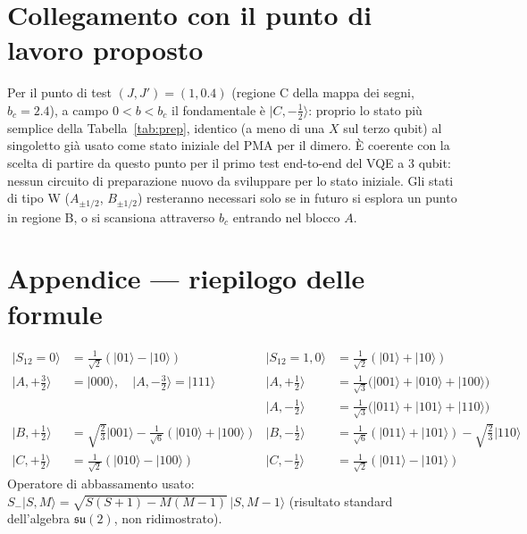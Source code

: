 \documentclass[11pt,a4paper]{article}
\newcommand{\ket}[1]{\lvert #1\rangle}
\begin{document}
\section{Collegamento con il punto di lavoro proposto}

Per il punto di test $(J,J')=(1,0.4)$ (regione C della mappa dei segni,
$b_c=2.4$), a campo $0<b<b_c$ il fondamentale è $\ket{C,{-}\tfrac12}$: proprio
lo stato più semplice della Tabella~\ref{tab:prep}, identico (a meno di una
$X$ sul terzo qubit) al singoletto già usato come stato iniziale del PMA per
il dimero. È coerente con la scelta di partire da questo punto per il primo
test end-to-end del VQE a 3 qubit: nessun circuito di preparazione nuovo da
sviluppare per lo stato iniziale. Gli stati di tipo W ($A_{\pm1/2}$, $B_{\pm1/2}$)
resteranno necessari solo se in futuro si esplora un punto in regione B, o si
scansiona attraverso $b_c$ entrando nel blocco $A$.

\section*{Appendice — riepilogo delle formule}
\begin{align*}
\ket{S_{12}{=}0} &= \tfrac1{\sqrt2}(\ket{01}-\ket{10}) &
\ket{S_{12}{=}1,0} &= \tfrac1{\sqrt2}(\ket{01}+\ket{10})\\
\ket{A,{+}\tfrac32} &= \ket{000},\quad \ket{A,{-}\tfrac32}=\ket{111} &
\ket{A,{+}\tfrac12} &= \tfrac1{\sqrt3}\big(\ket{001}{+}\ket{010}{+}\ket{100}\big) \\
& &
\ket{A,{-}\tfrac12} &= \tfrac1{\sqrt3}\big(\ket{011}{+}\ket{101}{+}\ket{110}\big) \\
\ket{B,{+}\tfrac12} &= \sqrt{\tfrac23}\ket{001}-\tfrac1{\sqrt6}(\ket{010}{+}\ket{100}) &
\ket{B,{-}\tfrac12} &= \tfrac1{\sqrt6}(\ket{011}{+}\ket{101})-\sqrt{\tfrac23}\ket{110}\\
\ket{C,{+}\tfrac12} &= \tfrac1{\sqrt2}(\ket{010}-\ket{100}) &
\ket{C,{-}\tfrac12} &= \tfrac1{\sqrt2}(\ket{011}-\ket{101})
\end{align*}
Operatore di abbassamento usato: $S_-\ket{S,M}=\sqrt{S(S{+}1)-M(M{-}1)}\,\ket{S,M{-}1}$
(risultato standard dell'algebra $\mathfrak{su}(2)$, non ridimostrato).
\end{document}
